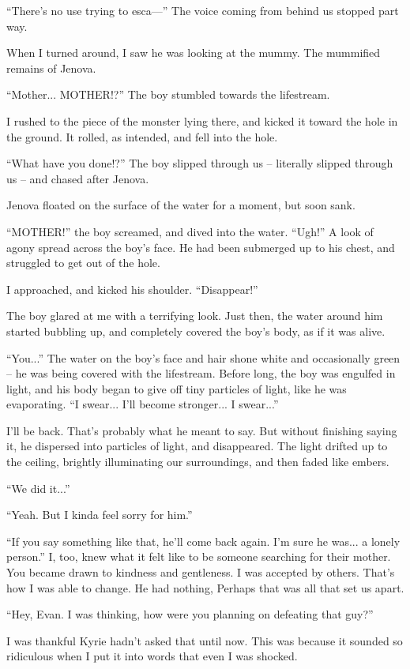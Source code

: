 \documentclass[oneside]{book}
\begin{document}
“There’s no use trying to esca—” The voice coming from behind us stopped part way.

When I turned around, I saw he was looking at the mummy. The mummified remains of Jenova.

“Mother... MOTHER!?” The boy stumbled towards the lifestream.

I rushed to the piece of the monster lying there, and kicked it toward the hole in the ground. It rolled, as intended, and fell into the hole.

“What have you done!?” The boy slipped through us – literally slipped through us – and chased after Jenova.

Jenova floated on the surface of the water for a moment, but soon sank.

“MOTHER!” the boy screamed, and dived into the water. “Ugh!” A look of agony spread across the boy’s face. He had been submerged up to his chest, and struggled to get out of the hole.

I approached, and kicked his shoulder. “Disappear!”

The boy glared at me with a terrifying look. Just then, the water around him started bubbling up, and completely covered the boy’s body, as if it was alive.

“You...” The water on the boy’s face and hair shone white and occasionally green – he was being covered with the lifestream. Before long, the boy was engulfed in light, and his body began to give off tiny particles of light, like he was evaporating. “I swear... I’ll become stronger... I swear...”

I’ll be back. That’s probably what he meant to say. But without finishing saying it, he dispersed into particles of light, and disappeared. The light drifted up to the ceiling, brightly illuminating our surroundings, and then faded like embers.

“We did it...”

“Yeah. But I kinda feel sorry for him.”

“If you say something like that, he’ll come back again. I’m sure he was... a lonely person.” I, too, knew what it felt like to be someone searching for their mother. You became drawn to kindness and gentleness. I was accepted by others. That’s how I was able to change. He had nothing, Perhaps that was all that set us apart.

“Hey, Evan. I was thinking, how were you planning on defeating that guy?”

I was thankful Kyrie hadn’t asked that until now. This was because it sounded so ridiculous when I put it into words that even I was shocked.
\end{document}

